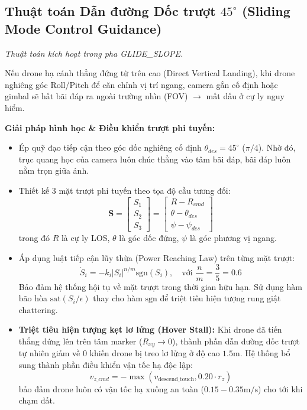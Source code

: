 \documentclass[12pt,a4paper]{article}
\begin{document}
\subsection{Thuật toán Dẫn đường Dốc trượt $45^\circ$ (Sliding Mode Control Guidance)}
\textit{Thuật toán kích hoạt trong pha GLIDE\_SLOPE.}

Nếu drone hạ cánh thẳng đứng từ trên cao (Direct Vertical Landing), khi drone nghiêng góc Roll/Pitch để căn chỉnh vị trí ngang, camera gắn cố định hoặc gimbal sẽ hất bãi đáp ra ngoài trường nhìn (FOV) $\to$ mất dấu ở cự ly nguy hiểm.

\noindent
\textbf{Giải pháp hình học \& Điều khiển trượt phi tuyến:}
\begin{itemize}[noitemsep,topsep=2pt]
    \item Ép quỹ đạo tiếp cận theo góc dốc nghiêng cố định $\theta_{des} = 45^\circ$ ($\pi/4$). Nhờ đó, trục quang học của camera luôn chúc thẳng vào tâm bãi đáp, bãi đáp luôn nằm trọn giữa ảnh.
    \item Thiết kế 3 mặt trượt phi tuyến theo tọa độ cầu tương đối:
    \begin{equation}
        \mathbf{S} = \begin{bmatrix} S_1 \\ S_2 \\ S_3 \end{bmatrix} = \begin{bmatrix} R - R_{cmd} \\ \theta - \theta_{des} \\ \psi - \psi_{des} \end{bmatrix}
    \end{equation}
    trong đó $R$ là cự ly LOS, $\theta$ là góc dốc đứng, $\psi$ là góc phương vị ngang.
    \item Áp dụng luật tiếp cận lũy thừa (Power Reaching Law) trên từng mặt trượt:
    \begin{equation}
        \dot{S}_i = -k_i |S_i|^{n/m} \text{sgn}(S_i), \quad \text{với } \frac{n}{m} = \frac{3}{5} = 0.6
    \end{equation}
    Bảo đảm hệ thống hội tụ về mặt trượt trong thời gian hữu hạn. Sử dụng hàm bão hòa $\text{sat}(S_i / \epsilon)$ thay cho hàm $\text{sgn}$ để triệt tiêu hiện tượng rung giật chattering.
    \item \textbf{Triệt tiêu hiện tượng kẹt lơ lửng (Hover Stall):} Khi drone đã tiến thẳng đứng lên trên tâm marker ($R_{xy} \to 0$), thành phần dẫn đường dốc trượt tự nhiên giảm về 0 khiến drone bị treo lơ lửng ở độ cao $1.5\text{m}$. Hệ thống bổ sung thành phần điều khiển vận tốc hạ độc lập:
    \begin{equation}
        v_{z\_cmd} = -\max\left(v_{\text{descend\_touch}}, 0.20 \cdot r_z\right)
    \end{equation}
    bảo đảm drone luôn có vận tốc hạ xuống an toàn ($0.15 - 0.35\text{m/s}$) cho tới khi chạm đất.
\end{itemize}
\end{document}
